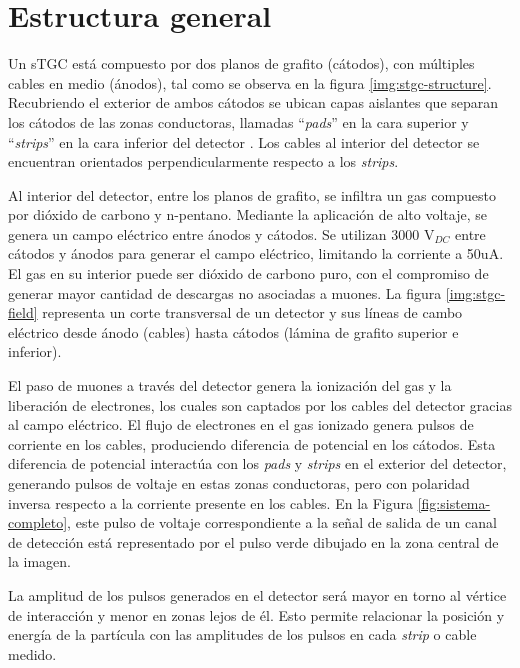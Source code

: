 \section{Estructura general}  

	Un sTGC está compuesto por dos planos de grafito (cátodos), con múltiples cables en medio (ánodos)\cite{Formenti2018CERNReport}, tal como se observa en la figura \ref{img:stgc-structure}. Recubriendo el exterior de ambos cátodos se ubican capas aislantes que separan los cátodos de las zonas conductoras, llamadas ``\textit{pads}'' en la cara superior y ``\textit{strips}'' en la cara inferior del detector . Los cables al interior del detector se encuentran orientados perpendicularmente respecto a los \textit{strips}.
	
	Al interior del detector, entre los planos de grafito, se infiltra un gas compuesto por dióxido de carbono y n-pentano\cite{Formenti2018CERNReport}. Mediante la aplicación de alto voltaje, se genera un campo eléctrico entre ánodos y cátodos. Se utilizan 3000 V$_{DC}$ entre cátodos y ánodos para generar el campo eléctrico, limitando la corriente a 50uA. El gas en su interior puede ser dióxido de carbono puro, con el compromiso de generar mayor cantidad de descargas no asociadas a muones. La figura \ref{img:stgc-field} representa un corte transversal de un detector y sus líneas de cambo eléctrico desde ánodo (cables) hasta cátodos (lámina de grafito superior e inferior). 
	
	El paso de muones a través del detector genera la ionización del gas y la liberación de electrones, los cuales son captados por los cables del detector gracias al campo eléctrico. El flujo de electrones en el gas ionizado genera pulsos de corriente en los cables, produciendo diferencia de potencial en los cátodos. Esta diferencia de potencial interactúa con los \textit{pads} y \textit{strips} en el exterior del detector, generando pulsos de voltaje en estas zonas conductoras, pero con polaridad inversa respecto a la corriente presente en los cables. En la Figura \ref{fig:sistema-completo}, este pulso de voltaje correspondiente a la señal de salida de un canal de detección está representado por el pulso verde dibujado en la zona central de la imagen.
	
	La amplitud de los pulsos generados en el detector será mayor en torno al vértice de interacción y menor en zonas lejos de él. Esto permite relacionar la posición y energía de la partícula con las amplitudes de los pulsos en cada \textit{strip} o cable medido.
	
